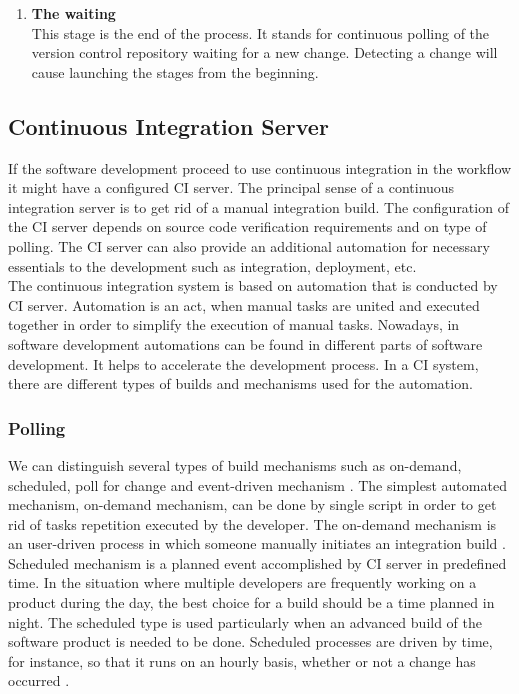 \begin{enumerate}
    \item \textbf{The waiting}\\[0.1em]
          This stage is the end of the process. It stands for continuous polling of  the version control repository waiting for a new change. Detecting a change will cause launching the stages from the beginning.

\end{enumerate}

\subsection{Continuous Integration Server}

If the software development proceed to use continuous integration in the workflow it might have a configured CI server. The principal sense of a continuous integration server is to get rid of a manual integration build. The configuration of the CI server depends on source code verification requirements and on type of polling. The CI server can also provide an additional automation for necessary essentials to the development such as integration, deployment, etc.\\

The continuous integration system is based on automation that is conducted by CI server. Automation is an act, when manual tasks are united and executed together in order to simplify the execution of manual tasks. Nowadays, in software development automations can be found in different parts of software development. It helps to accelerate the development process. In a CI system, there are different types of builds and mechanisms used for the automation.

\subsubsection{Polling}

We can distinguish several types of build mechanisms such as on-demand, scheduled, poll for change and event-driven mechanism \cite{CIbook}. The simplest automated mechanism, on-demand mechanism, can be done by single script in order to get rid of tasks repetition executed by the developer. The on-demand mechanism is an user-driven process in which someone manually initiates an integration build \cite{CIbook}. Scheduled mechanism is a planned event accomplished by CI server in predefined time. In the situation where multiple developers are frequently working on a product during the day, the best choice for a build should be a time planned in night. The scheduled type is used particularly when an advanced build of the software product is needed to be done. Scheduled processes are driven by time, for instance, so that it runs on an hourly basis, whether or not a change has occurred \cite{CIbook}.\\

